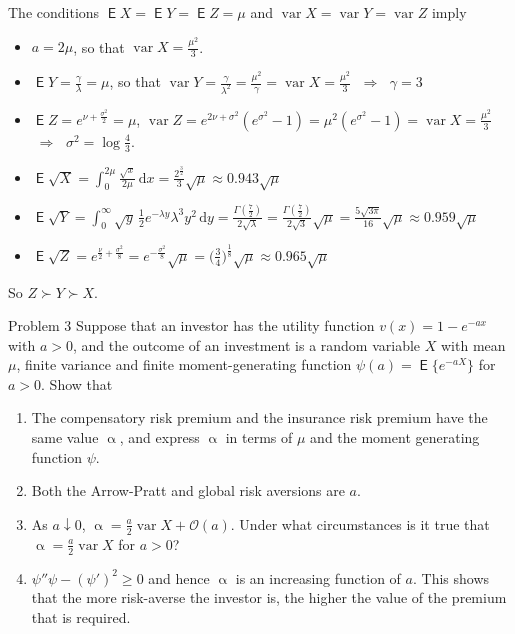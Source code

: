 \documentclass[10pt,handout]{beamer}
\newcommand{\ds}{\displaystyle}
\newcommand{\ie}{\;\Longrightarrow\;}
\DeclareMathOperator\expc{\mathsf{E}}
\DeclareMathOperator\var{var}
\theoremstyle{definition}
\begin{document}
\begin{frame}[allowframebreaks]
  The conditions $\expc X = \expc Y = \expc Z = \mu$ and $\var X = \var Y = \var Z$ imply 
  \begin{itemize}
    \item $a = 2\mu$, so that $\ds\var X = \frac{\mu^2}{3}$.
    \item $\ds\expc Y = \frac{\gamma}{\lambda} = \mu$, so that $\ds\var Y = \frac{\gamma}{\lambda^2} = \frac{\mu^2}{\gamma} = \var X = \frac{\mu^2}{3}$ $\ie$ $\gamma = 3$ 
    \item $\ds\expc Z = e^{\nu + \frac{\sigma^2}{2}} = \mu$, $\ds\var Z = e^{2\nu + \sigma^2}(e^{\sigma^2} - 1) = \mu^2(e^{\sigma^2} - 1) = \var X = \frac{\mu^2}{3}$ $\ie$ $\ds\sigma^2 = \log\frac{4}{3}$. 
  \end{itemize}
  \begin{itemize}
    \item $\ds\expc\sqrt{X} = \int_0^{2\mu}\frac{\sqrt{x}}{2\mu}\,\text{d}x = \frac{2^{\frac{3}{2}}}{3}\sqrt{\mu}\approx 0.943\sqrt{\mu}$
    \item $\ds\expc\sqrt{Y} = \int_0^\infty\sqrt{y}\,\frac{1}{2}e^{-\lambda y}\lambda^3 y^2\,\text{d}y = \frac{\Gamma(\frac{7}{2})}{2\sqrt{\lambda}} = \frac{\Gamma(\frac{7}{2})}{2\sqrt{3}}\sqrt{\mu} = \frac{5\sqrt{3\pi}}{16}\sqrt{\mu}\approx 0.959\sqrt{\mu}$
    \item $\ds\expc\sqrt{Z} = e^{\frac{\nu}{2} + \frac{\sigma^2}{8}} = e^{-\frac{\sigma^2}{8}}\sqrt{\mu} = \Big(\frac{3}{4}\Big)^{\frac{1}{8}}\sqrt{\mu}\approx 0.965\sqrt{\mu}$
  \end{itemize}
  So $Z\succ Y\succ X$.
\end{frame}

\begin{frame}{Problem 3}
  Suppose that an investor has the utility function $v(x) = 1 - e^{-a x}$ with $a > 0$, and the outcome of an investment is a random variable $X$ with mean $\mu$, finite variance and finite moment-generating function $\psi(a) = \expc\big\{e^{-aX}\big\}$ for $a > 0$. Show that 
  \begin{enumerate}
    \item The compensatory risk premium and the insurance risk premium have the same value $\upalpha$, and express $\upalpha$ in terms of $\mu$ and the moment generating function $\psi$.
    \item Both the Arrow-Pratt and global risk aversions are $a$.
    \item As $a\downarrow 0$, $\ds\upalpha = \frac{a}{2}\var{X} + \mathcal{O}(a)$. Under what circumstances is it true that $\ds\upalpha = \frac{a}{2}\var{X}$ for $a > 0$?
    \item $\psi''\psi - (\psi')^2\geqslant 0$ and hence $\upalpha$ is an increasing function of $a$. This shows that the more risk-averse the investor is, the higher the value of the premium that is required.
  \end{enumerate}
\end{frame}
\end{document}
